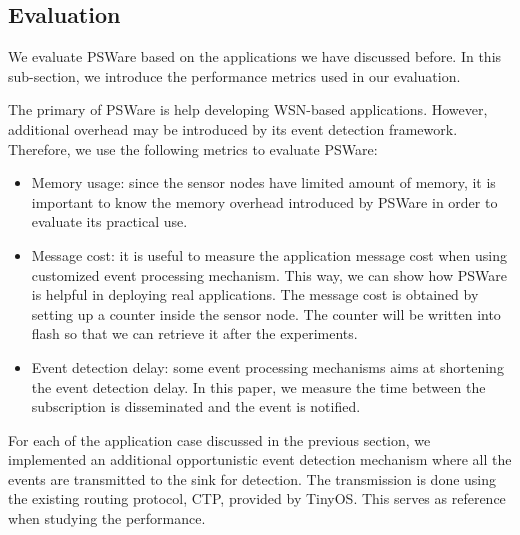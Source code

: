 \subsection{Evaluation}
We evaluate PSWare based on the applications we have discussed before. In this sub-section, we introduce the performance metrics used in our evaluation.

The primary of PSWare is help developing WSN-based applications. However, additional overhead may be introduced by its event detection framework. Therefore, we use the following metrics to evaluate PSWare:
\begin{itemize}
\item Memory usage: since the sensor nodes have limited amount of memory, it is important to know the memory overhead introduced by PSWare in order to evaluate its practical use. 
\item Message cost: it is useful to measure the application message cost when using customized event processing mechanism. This way, we can show how PSWare is helpful in deploying real applications. The message cost is obtained by setting up a counter inside the sensor node. The counter will be written into flash so that we can retrieve it after the experiments.
\item Event detection delay: some event processing mechanisms aims at shortening the event detection delay. In this paper, we measure the time between the subscription is disseminated and the event is notified.
\end{itemize}

For each of the application case discussed in the previous section, we implemented an additional opportunistic event detection mechanism where all the events are transmitted to the sink for detection. The transmission is done using the existing routing protocol, CTP, provided by TinyOS. This serves as reference when studying the performance.

